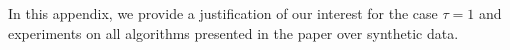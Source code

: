 \documentclass[a4paper,cleveref, autoref, thm-restate,UKenglish]{lipics-v2019}
\newcommand\pma{\textsc{pma}\xspace}
\newcommand\compactpair{\texttt{Compact Pairs}\xspace}
\begin{document}







\newpage
\appendix

\label{sec:appendix}


In this appendix, we provide a justification of our interest for the case $\tau = 1$
and experiments on all algorithms presented in the paper over synthetic data.
\end{document}
